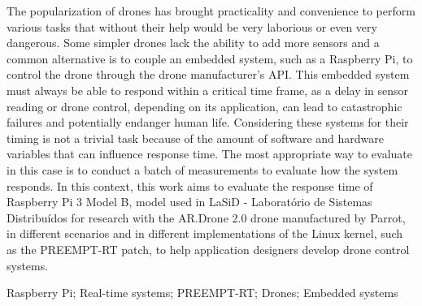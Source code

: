 \abstract
The popularization of drones has brought practicality and convenience to perform various tasks that without their help would be very laborious or even very dangerous. Some simpler drones lack the ability to add more sensors and a common alternative is to couple an embedded system, such as a Raspberry Pi, to control the drone through the drone manufacturer's API. This embedded system must always be able to respond within a critical time frame, as a delay in sensor reading or drone control, depending on its application, can lead to catastrophic failures and potentially endanger human life. Considering these systems for their timing is not a trivial task because of the amount of software and hardware variables that can influence response time. The most appropriate way to evaluate in this case is to conduct a batch of measurements to evaluate how the system responds. In this context, this work aims to evaluate the response time of Raspberry Pi 3 Model B, model used in LaSiD - Laboratório de Sistemas Distribuídos for research with the AR.Drone 2.0 drone manufactured by Parrot, in different scenarios and in different implementations of the Linux kernel, such as the PREEMPT-RT patch, to help application designers develop drone control systems.

\begin{keywords}
Raspberry Pi; Real-time systems; PREEMPT-RT; Drones; Embedded systems
\end{keywords}
